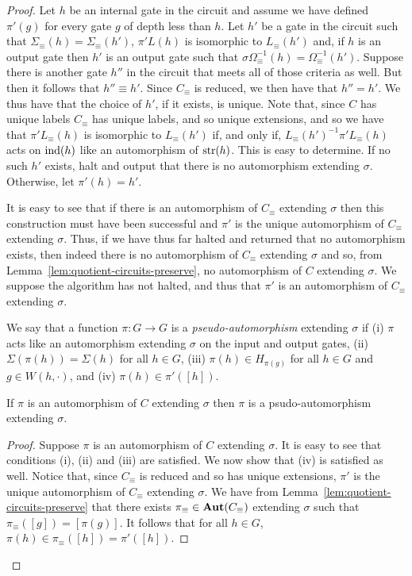 \documentclass[../paper.tex]{subfiles}
\begin{document}
\begin{proof}
  Let $h$ be an internal gate in the circuit and assume we have defined
  $\pi'(g)$ for every gate $g$ of depth less than $h$. Let $h'$ be a gate in the
  circuit such that $\Sigma_\equiv(h) = \Sigma_\equiv (h')$, $\pi' L(h)$ is
  isomorphic to $L_\equiv(h')$ and, if $h$ is an output gate then $h'$ is an
  output gate such that $\sigma \Omega^{-1}_\equiv(h) = \Omega^{-1}_\equiv(h')$.
  Suppose there is another gate $h''$ in the circuit that meets all of those
  criteria as well. But then it follows that $h'' \equiv h'$. Since $C_\equiv$
  is reduced, we then have that $h'' = h'$. We thus have that the choice of
  $h'$, if it exists, is unique. Note that, since $C$ has unique labels
  $C_\equiv$ has unique labels, and so unique extensions, and so we have that
  $\pi' L_\equiv(h)$ is isomorphic to $L_\equiv(h')$ if, and only if,
  $L_\equiv(h')^{-1}\pi'L_\equiv(h)$ acts on $\text{\upshape ind}(h)$ like an automorphism of
  $\text{str}(h)$. This is easy to determine. If no such $h'$ exists, halt and output
  that there is no automorphism extending $\sigma$. Otherwise, let $\pi'(h) =
  h'$.

  It is easy to see that if there is an automorphism of $C_\equiv$ extending
  $\sigma$ then this construction must have been successful and $\pi'$ is the
  unique automorphism of $C_\equiv$ extending $\sigma$. Thus, if we have thus
  far halted and returned that no automorphism exists, then indeed there is no
  automorphism of $C_\equiv$ extending $\sigma$ and so, from
  Lemma~\ref{lem:quotient-circuits-preserve}, no automorphism of $C$ extending
  $\sigma$. We suppose the algorithm has not halted, and thus that $\pi'$ is an
  automorphism of $C_\equiv$ extending $\sigma$.

  We say that a function $\pi : G \rightarrow G$ is a \emph{pseudo-automorphism}
  extending $\sigma$ if (i) $\pi$ acts like an automorphism extending $\sigma$
  on the input and output gates, (ii) $\Sigma (\pi (h)) = \Sigma(h)$ for all $h
  \in G$, (iii) $\pi(h) \in H_{\pi(g)}$ for all $h \in G$ and $g \in W(h,
  \cdot)$, and (iv) $\pi (h) \in \pi'([h])$.

\begin{claim}
  If $\pi$ is an automorphism of $C$ extending $\sigma$ then $\pi$ is a
  psudo-automorphism extending $\sigma$.
\end{claim}
\begin{proof}
  Suppose $\pi$ is an automorphism of $C$ extending $\sigma$. It is easy to see
  that conditions (i), (ii) and (iii) are satisfied. We now show that (iv) is
  satisfied as well. Notice that, since $C_\equiv$ is reduced and so has unique
  extensions, $\pi'$ is the unique automorphism of $C_\equiv$ extending
  $\sigma$. We have from Lemma~\ref{lem:quotient-circuits-preserve} that there
  exists $\pi_\equiv \in \text{\textbf{Aut}}(C_\equiv)$ extending $\sigma$ such that
  $\pi_\equiv ([g]) = [\pi(g)]$. It follows that for all $h \in G$, $\pi(h) \in
  \pi_\equiv([h]) = \pi'([h])$.
\end{proof}


\end{proof}
\end{document}
